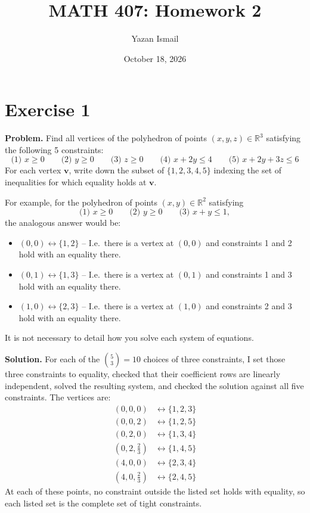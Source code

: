 \documentclass[11pt]{article}
\title{MATH 407: Homework 2}
\author{Yazan Ismail}
\date{October 18, 2026}
\begin{document}
\maketitle

\section*{Exercise 1}

\noindent\textbf{Problem.}
Find all vertices of the polyhedron of points $(x,y,z) \in \mathbb{R}^3$ satisfying the following 5 constraints:
\[
\text{(1) } x \ge 0 \qquad
\text{(2) } y \ge 0 \qquad
\text{(3) } z \ge 0 \qquad
\text{(4) } x + 2y \le 4 \qquad
\text{(5) } x + 2y + 3z \le 6
\]
For each vertex $\mathbf{v}$, write down the subset of $\{1,2,3,4,5\}$ indexing the set of inequalities for which equality holds at $\mathbf{v}$.

For example, for the polyhedron of points $(x,y) \in \mathbb{R}^2$ satisfying
\[
\text{(1) } x \ge 0 \qquad
\text{(2) } y \ge 0 \qquad
\text{(3) } x + y \le 1,
\]
the analogous answer would be:
\begin{itemize}
  \item $(0,0) \leftrightarrow \{1,2\}$ -- I.e.\ there is a vertex at $(0,0)$ and constraints 1 and 2 hold with an equality there.
  \item $(0,1) \leftrightarrow \{1,3\}$ -- I.e.\ there is a vertex at $(0,1)$ and constraints 1 and 3 hold with an equality there.
  \item $(1,0) \leftrightarrow \{2,3\}$ -- I.e.\ there is a vertex at $(1,0)$ and constraints 2 and 3 hold with an equality there.
\end{itemize}
It is not necessary to detail how you solve each system of equations.

\medskip
\noindent\textbf{Solution.}
For each of the $\binom{5}{3} = 10$ choices of three constraints, I set those three constraints to equality, checked that their coefficient rows are linearly independent, solved the resulting system, and checked the solution against all five constraints. The vertices are:
\begin{align*}
(0,0,0) &\leftrightarrow \{1,2,3\} \\
(0,0,2) &\leftrightarrow \{1,2,5\} \\
(0,2,0) &\leftrightarrow \{1,3,4\} \\
(0,2,\tfrac{2}{3}) &\leftrightarrow \{1,4,5\} \\
(4,0,0) &\leftrightarrow \{2,3,4\} \\
(4,0,\tfrac{2}{3}) &\leftrightarrow \{2,4,5\}
\end{align*}
At each of these points, no constraint outside the listed set holds with equality, so each listed set is the complete set of tight constraints.
\end{document}
